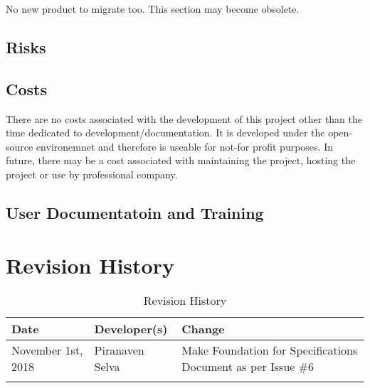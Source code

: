 \documentclass{article}
\begin{document}
No new product to migrate too. This section may become obsolete. 

\subsection{Risks}
\subsection{Costs}

There are no costs associated with the development of this project other than the time dedicated to development/documentation. It is developed under the open-source environemnet and therefore is useable for not-for profit purposes.   In future, there may be a cost associated with maintaining the project, hosting the project or use by professional company.  

\subsection{User Documentatoin and Training}





\newpage
\section{Revision History}
\begin{table}[hp]
\caption{Revision History} \label{TblRevisionHistory}
\begin{tabularx}{\textwidth}{llX}
\toprule
\textbf{Date} & \textbf{Developer(s)} & \textbf{Change}\\
\midrule
November 1st, 2018 &Piranaven Selva & Make Foundation for Specifications Document as per Issue \#6 \\
\\
\bottomrule
\end{tabularx}
\end{table}
\end{document}
